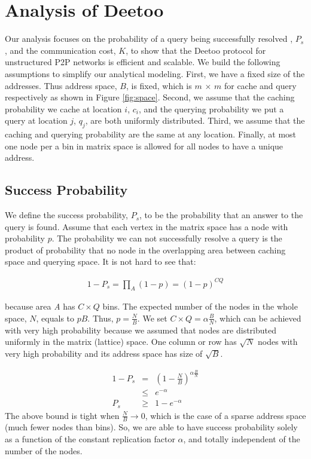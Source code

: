 \section{Analysis of Deetoo}\label{sec:analysis}
Our analysis focuses on the probability of a query being successfully resolved
, $P_{s}$, and the communication cost, $K$, 
to show that the Deetoo protocol for unstructured P2P
networks is efficient and scalable. We build the following assumptions to 
simplify our analytical modeling.
First, we have a fixed size of the addresses. Thus
address space, $B$, is fixed, which is $m$ $\times$
$m$ for cache and query respectively as shown in
Figure \ref{fig:space}. Second, we assume that the caching probability we
cache at location $i$, $c_{i}$, and the querying
probability we put a query at location $j$, $q_{j}$, are both
uniformly distributed. Third, we assume that the caching and querying
probability are the same at any location. Finally, at most one node per
a bin in matrix space is allowed for all nodes to have a unique
address.


\subsection{Success Probability}
\label{sec:suc_prob}
We define the success probability, $P_{s}$, to be the probability
that an answer to the query is found. Assume that each vertex in the
matrix space has a node with probability $p$. The probability
we can not successfully resolve a query is the product of probability that no
node in the overlapping area between caching space and querying
space. It is not hard to see that:
\begin{center}
\begin{eqnarray*}
1-P_{s} = \prod_{A}(1-p) = (1-p)^{C Q}
\end{eqnarray*}
\end{center}
because area \textit{A} has $C\times Q$ bins.
The expected number of the nodes in the whole space, 
$N$, equals to $pB$. Thus, $p = \frac{N}{B}$.
We set $C\times Q = \alpha \frac{B}{N}$,
which can be achieved with very high probability because we assumed
that nodes are distributed uniformly in the matrix (lattice) space.
One column or row has $\sqrt{N}$ nodes with very high probability
and its address space has size of $\sqrt{B}$. 

\begin{eqnarray*}%
1-P_{s} &=& \left(1-\frac{N}{B}\right)^{\alpha \frac{B}{N}}\\
        &\le& e^{-\alpha}\\
	P_{s} &\ge & 1 - e^{-\alpha}
\end{eqnarray*} 
The above bound is tight when $\frac{N}{B}\rightarrow 0$,
which is the case of a sparse address space (much fewer nodes 
than bins).
So, we are able to have success probability solely as a function of the 
constant replication factor $\alpha$, and totally 
independent of the number of the nodes.

